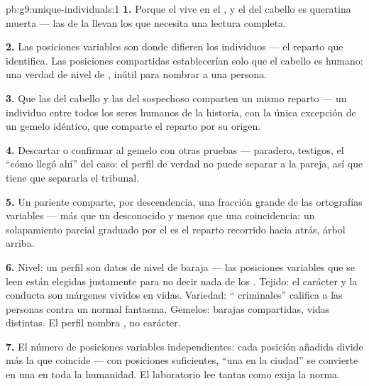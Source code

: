 \begin{solution}{pb:g9:unique-individuals:1}
\textbf{1.} Porque el  vive en el , y el  del cabello es
queratina muerta --- las  de la  llevan los  que
necesita una lectura completa.

\textbf{2.} Las posiciones variables son donde difieren los individuos
--- el reparto que identifica. Las posiciones compartidas establecerían
solo que el cabello es humano: una verdad de nivel de , inútil
para nombrar a una persona.

\textbf{3.} Que las  del cabello y las del sospechoso comparten un
mismo reparto --- un individuo entre todos los seres humanos de la
historia, con la única excepción de un gemelo idéntico, que comparte el
reparto por su origen.

\textbf{4.} Descartar o confirmar al gemelo con otras pruebas ---
paradero, testigos, el ``cómo llegó ahí'' del caso: el perfil de verdad
no puede separar a la pareja, así que tiene que separarla el tribunal.

\textbf{5.} Un pariente comparte, por descendencia, una fracción grande
de las ortografías variables --- más que un desconocido y menos que una
coincidencia: un solapamiento parcial graduado por el  es el
reparto recorrido hacia atrás, árbol arriba.

\textbf{6.} Nivel: un perfil son datos de nivel de baraja --- las
posiciones variables que se leen están elegidas justamente para no
decir nada de los . Tejido: el carácter y la conducta son
márgenes vividos en vidas. Variedad: `` criminales'' califica a
las personas contra un normal fantasma. Gemelos: barajas compartidas,
vidas distintas. El perfil nombra , no carácter.

\textbf{7.} El número de posiciones variables independientes: cada
posición añadida divide más la  que coincide --- con
posiciones suficientes, ``una en la ciudad'' se convierte en una en
toda la humanidad. El laboratorio lee tantas como exija la norma.


\end{solution}
